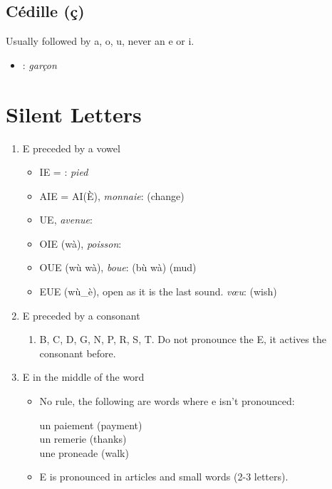 \documentclass{book}
\begin{document}
    \section{Cédille (ç)}
        Usually followed by a, o, u, never an e or i.
        \begin{itemize}
            \item \textipa{[s]}: \textit{garçon}
        \end{itemize}

\chapter{Silent Letters}

    \begin{enumerate}
        \item E preceded by a vowel
            \begin{itemize}
                \item IE = \textipa{[i]}: \textit{pied}
                \item AIE = AI(È), \textit{monnaie}: \textipa{[mOnE]} (change)
                \item UE, \textit{avenue}: \textipa{[av@ny]} 
                \item OIE (wà), \textit{poisson}: \textipa{[pwAsO]}
                \item OUE (wù wà), \textit{boue}: \textipa{[bu]} (bù wà) (mud)
                \item EUE (wù\_è), open as it is the last sound. \textit{vœu}: \textipa{[v2]} (wish)
            \end{itemize}

        \item E preceded by a consonant
            \begin{enumerate}
                \item B, C, D, G, N, P, R, S, T. Do not pronounce the E, it actives the consonant before.
            \end{enumerate}

        \item E in the middle of the word
            \begin{itemize}
                \item No rule, the following are words where e isn't pronounced:
                    \begin{center}
                        un paiement \textipa{[pajm\~{a}]} (payment) \\
                        un remerie \textipa{[r@mEri]} (thanks) \\
                        une proneade \textipa{[pR\~{O}nad]} (walk)
                    \end{center}
                \item E is pronounced in articles and small words (2-3 letters).
            \end{itemize}
        

\end{enumerate}
\end{document}
